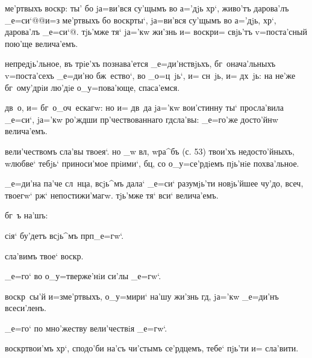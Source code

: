 ме'ртвыхъ воскр: ты' бо jа=ви'вся су'щымъ во 
а='дjь хр`, живо'тъ дарова'лъ _е=си`@{@и=з\ъ 
ме'ртвыхъ бо воскр ты`, jа=ви'вся су'щымъ во а='дjь, 
хр`, дарова'лъ _е=си`@}. тjь'мже тя` jа='кw жи'знь и= 
воскр и= свjь'тъ v=поста'сный пою'ще велича'емъ.

непредjь'льное, въ трiе'хъ познава'ется _е=ди'нствjьхъ, 
бг~онача'льныхъ v=поста'сехъ _е=ди'но бж~ество`, во 
_о=ц~jь`, и= сн~jь, и= дх~jь: на не'же бг~ому'дрiи лю'дiе 
о_у=пова'юще, спаса'емся.


дв~о, и= бг~о_оч~ескагw: но и= дв~да jа='кw вои'стинну 
ты` просла'вила _е=си`, jа='кw ро'ждши 
пр'чествованнаго гд сла'вы: _е=го'же досто'йнw 
велича'емъ.

вели'чествомъ сла'вы твоея`. но _w вл, w\т ра^бъ (с. 
53) твои'хъ недосто'йныхъ, w\т любве` тебjь` приноси'мое 
прiими`, бц, со о_у=се'рдiемъ пjь'нiе похва'льное.

_е=ди'на па'че сл~нца, всjь^мъ дала` _е=си` разумjь'ти 
новjь'йшее чу'до, всеч, твоегw` рж` 
непостижи'магw. тjь'мже тя` вси` велича'емъ.

бг~ъ на'шъ: %


сiя` бу'детъ всjь^мъ прп _е=гw`.

сла'вимъ твое` воскр.

_е=го` во о_у=тверже'нiи си'лы _е=гw`.

воскр~сы'й и=з\ъ ме'ртвыхъ, о_у=мири` на'шу жи'знь гд, 
jа='кw _е=ди'нъ всеси'ленъ.

_е=го` по мно'жеству вели'чествiя _е=гw`.

воскр твои'мъ хр`, сподо'би на'съ чи'стымъ 
се'рдцемъ, тебе` пjь'ти и= сла'вити.

